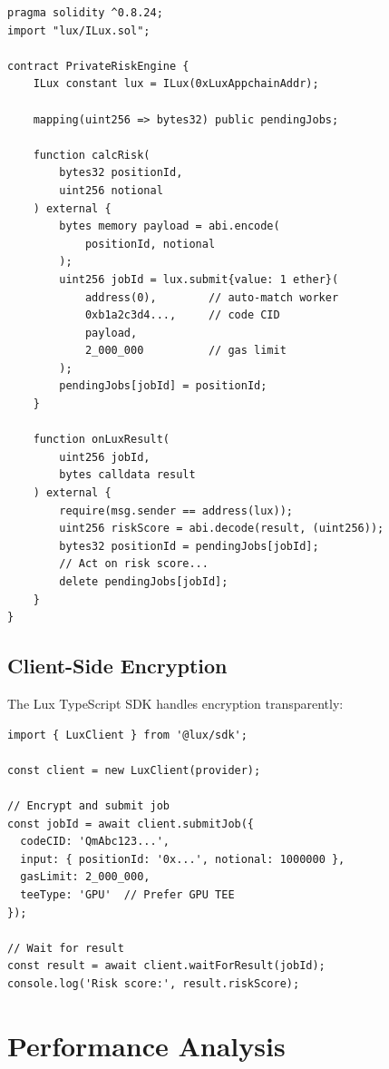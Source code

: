 \documentclass[11pt,letterpaper]{article}
\begin{document}
\begin{lstlisting}[caption={Private Risk Engine Example},label={lst:dev-example}]
pragma solidity ^0.8.24;
import "lux/ILux.sol";

contract PrivateRiskEngine {
    ILux constant lux = ILux(0xLuxAppchainAddr);

    mapping(uint256 => bytes32) public pendingJobs;

    function calcRisk(
        bytes32 positionId,
        uint256 notional
    ) external {
        bytes memory payload = abi.encode(
            positionId, notional
        );
        uint256 jobId = lux.submit{value: 1 ether}(
            address(0),        // auto-match worker
            0xb1a2c3d4...,     // code CID
            payload,
            2_000_000          // gas limit
        );
        pendingJobs[jobId] = positionId;
    }

    function onLuxResult(
        uint256 jobId,
        bytes calldata result
    ) external {
        require(msg.sender == address(lux));
        uint256 riskScore = abi.decode(result, (uint256));
        bytes32 positionId = pendingJobs[jobId];
        // Act on risk score...
        delete pendingJobs[jobId];
    }
}
\end{lstlisting}

\subsection{Client-Side Encryption}

The Lux TypeScript SDK handles encryption transparently:

\begin{lstlisting}[language=Solidity,caption={TypeScript SDK Usage}]
import { LuxClient } from '@lux/sdk';

const client = new LuxClient(provider);

// Encrypt and submit job
const jobId = await client.submitJob({
  codeCID: 'QmAbc123...',
  input: { positionId: '0x...', notional: 1000000 },
  gasLimit: 2_000_000,
  teeType: 'GPU'  // Prefer GPU TEE
});

// Wait for result
const result = await client.waitForResult(jobId);
console.log('Risk score:', result.riskScore);
\end{lstlisting}

\section{Performance Analysis}
\end{document}
